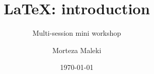 \documentclass[9pt]{beamer}
\title{\LaTeX: introduction}
\subtitle{Multi-session mini workshop}
\author{Morteza Maleki}
\institute{Tarbiat Modares University}
\date{\today}
\begin{document}
    
    \begin{frame}
        \titlepage
    \end{frame}
    

    

    

	


	

    
\end{document}
